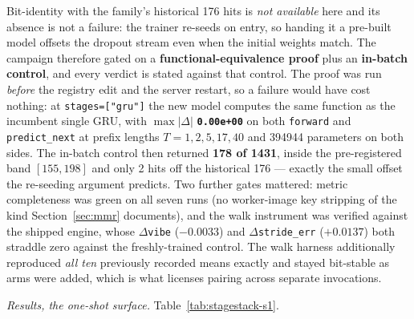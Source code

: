 \documentclass[11pt]{article}
\begin{document}
Bit-identity with the family's historical \num{176} hits is \emph{not available}
here and its absence is not a failure: the trainer re-seeds on entry, so handing it
a pre-built model offsets the dropout stream even when the initial weights match.
The campaign therefore gated on a \textbf{functional-equivalence proof} plus an
\textbf{in-batch control}, and every verdict is stated against that control. The
proof was run \emph{before} the registry edit and the server restart, so a failure
would have cost nothing: at \texttt{stages=["gru"]} the new model computes the same
function as the incumbent single GRU, with $\max|\Delta|$ \textbf{\texttt{0.00e+00}}
on both \texttt{forward} and \texttt{predict\_next} at prefix lengths
$T=1,2,5,17,40$ and \num{394944} parameters on both sides. The in-batch control
then returned \textbf{\num{178} of \num{1431}}, inside the pre-registered band
$[\num{155},\num{198}]$ and only \num{2} hits off the historical \num{176} ---
exactly the small offset the re-seeding argument predicts. Two further gates
mattered: metric completeness was green on all seven runs (no worker-image key
stripping of the kind Section~\ref{sec:mmr} documents), and the walk instrument
was verified against the shipped engine, whose $\Delta$\texttt{vibe}
($-\num{0.0033}$) and $\Delta$\texttt{stride\_err} ($+\num{0.0137}$) both straddle
zero against the freshly-trained control. The walk harness additionally reproduced
\emph{all ten} previously recorded means exactly and stayed bit-stable as arms were
added, which is what licenses pairing across separate invocations.

\emph{Results, the one-shot surface.} Table~\ref{tab:stagestack-s1}.
\end{document}
